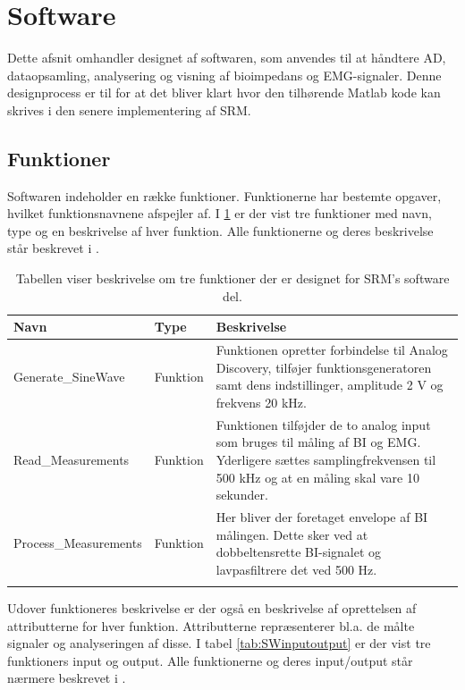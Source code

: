 \section{Software}

Dette afsnit omhandler designet af softwaren, som anvendes til at håndtere AD, dataopsamling, analysering og visning af bioimpedans og EMG-signaler. Denne designprocess
er til for at det bliver klart hvor den tilhørende Matlab kode kan skrives i den senere
implementering af SRM.


\subsection{Funktioner}
Softwaren indeholder en række funktioner. Funktionerne har bestemte opgaver, hvilket funktionsnavnene afspejler af. I \ref{tab:funktioner} er der vist tre funktioner med navn, type og en beskrivelse af hver funktion. Alle funktionerne og deres beskrivelse står beskrevet i . 

\begin{table}[H]

\begin{tabularx}{\textwidth}{l l X}
     Navn	&	Type		&	Beskrivelse \\ \midrule
     Generate\_SineWave	&	Funktion	&	Funktionen opretter forbindelse til Analog Discovery, tilføjer funktionsgeneratoren samt dens indstillinger, amplitude 2 V og frekvens 20 kHz.\\   \addlinespace[2mm]
     Read\_Measurements	&	Funktion	&	Funktionen tilføjder de to analog input som bruges til måling af BI og EMG. Yderligere sættes samplingfrekvensen til 500 kHz og at en måling skal vare 10 sekunder.\\   \addlinespace[2mm]
     Process\_Measurements	&	Funktion	&	Her bliver der foretaget envelope af BI målingen. Dette sker ved at dobbeltensrette BI-signalet og lavpasfiltrere det ved 500 Hz.   \\   \addlinespace[2mm]
     \bottomrule                                                                                                                   
    \end{tabularx}
    \caption {Tabellen viser beskrivelse om tre funktioner der er designet for SRM's software del.}
    \label{tab:funktioner}
	
\end{table}

Udover funktioneres beskrivelse er der også en beskrivelse af oprettelsen af attributterne for hver funktion. Attributterne repræsenterer bl.a. de målte signaler og analyseringen af disse. I tabel \ref{tab:SWinputoutput} er der vist tre funktioners input og output. Alle funktionerne og deres input/output står nærmere beskrevet i .


